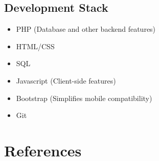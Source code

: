 \documentclass[12pt]{article}
\begin{document}
\subsection{Development Stack}
\begin{itemize}
    \item PHP (Database and other backend features)
    \item HTML/CSS
    \item SQL
    \item Javascript (Client-side features)
    \item Bootstrap (Simplifies mobile compatibility)
    \item Git
\end{itemize}


\section{References}
\end{document}

